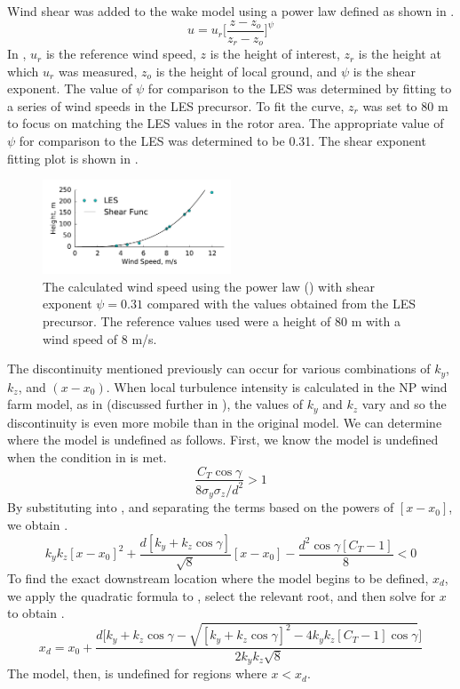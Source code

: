 \documentclass[conf]{new-aiaa}
\begin{document}
Wind shear was added to the wake model using a power law defined as shown in .
%
\begin{equation} \label{eq:shear}
	u = u_r\bigg[\frac{z-z_o}{z_r-z_o}\bigg]^\psi
\end{equation}
%
In , $u_r$ is the reference wind speed, $z$ is the height of interest, $z_r$ is the height at which $u_r$ was measured, $z_o$ is the height of local ground, and $\psi$ is the shear exponent. The value of $\psi$ for comparison to the LES was determined by fitting  to a series of wind speeds in the LES precursor. To fit the curve, $z_r$ was set to 80 m to focus on matching the LES values in the rotor area. The appropriate value of $\psi$ for comparison to the LES was determined to be 0.31.
The shear exponent fitting plot is shown in .
%
\begin{figure}[ht]
	\centering
	\includegraphics[width=0.5\textwidth]{final_images/shear_fit.pdf}
	\caption{The calculated wind speed using the power law () with shear exponent $\psi=0.31$ compared with the values obtained from the LES precursor. The reference values used were a height of 80 m with a wind speed of 8 m/s.}
	\label{fig:shear_fit}
\end{figure}
%

The discontinuity mentioned previously can occur for various combinations of $k_y$, $k_z$, and $(x-x_0)$. When local turbulence intensity is calculated in the NP wind farm model, as in \cite{niayifar2016} (discussed further in ), the values of $k_y$ and $k_z$ vary and so the discontinuity is even more mobile than in the original model. We can determine where the model is undefined as follows. First, we know the model is undefined when the condition in  is met.
%
\begin{equation}\label{eq:gt1}
	\frac{C_T \cos{\gamma}}{8\sigma_y \sigma_z/d^2} > 1
\end{equation}
%
By substituting  into , and separating the terms based on the powers of $[x-x_0]$, we obtain .
%
\begin{equation}\label{eq:xd1}
	k_y k_z [x-x_0]^2 + \frac{d[k_y+k_z \cos{\gamma}]}{\sqrt{8}}[x-x_0] - \frac{d^2 \cos{\gamma}[C_T -1]}{8} < 0
\end{equation}
%
To find the exact downstream location where the model begins to be defined, $x_d$, we apply the quadratic formula to , select the relevant root, and then solve for $x$ to obtain .
%
\begin{equation}\label{eq:xd}
	x_d = x_0 + \frac{d\Bigg[k_y+k_z\cos{\gamma} - \sqrt{[k_y+k_z\cos{\gamma}]^2-4k_y k_z[C_T-1]\cos{\gamma}}\Bigg]}{2k_y k_z\sqrt{8}}
\end{equation}
%
The model, then, is undefined for regions where $x<x_d$. 
\end{document}
